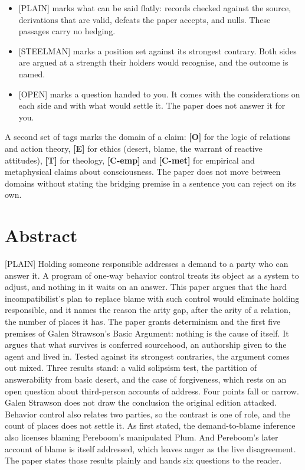 \documentclass[11pt]{article}
\newcommand{\register}[1]{{\ttfamily\small #1}}
\begin{document}
\begin{itemize}
\item \register{[PLAIN]} marks what can be said flatly: records checked against the source, derivations that are valid, defeats the paper accepts, and nulls. These passages carry no hedging.
\item \register{[STEELMAN]} marks a position set against its strongest contrary. Both sides are argued at a strength their holders would recognise, and the outcome is named.
\item \register{[OPEN]} marks a question handed to you. It comes with the considerations on each side and with what would settle it. The paper does not answer it for you.
\end{itemize}
A second set of tags marks the domain of a claim: \textbf{[O]} for the logic of relations and action theory, \textbf{[E]} for ethics (desert, blame, the warrant of reactive attitudes), \textbf{[T]} for theology, \textbf{[C-emp]} and \textbf{[C-met]} for empirical and metaphysical claims about consciousness. The paper does not move between domains without stating the bridging premise in a sentence you can reject on its own.

\section*{Abstract}

\register{[PLAIN]} Holding someone responsible addresses a demand to a party who can answer it. A program of one-way behavior control treats its object as a system to adjust, and nothing in it waits on an answer. This paper argues that the hard incompatibilist's plan to replace blame with such control would eliminate holding responsible, and it names the reason the arity gap, after the arity of a relation, the number of places it has. The paper grants determinism and the first five premises of Galen Strawson's Basic Argument: nothing is the cause of itself. It argues that what survives is conferred sourcehood, an authorship given to the agent and lived in. Tested against its strongest contraries, the argument comes out mixed. Three results stand: a valid solipsism test, the partition of answerability from basic desert, and the case of forgiveness, which rests on an open question about third-person accounts of address. Four points fall or narrow. Galen Strawson does not draw the conclusion the original edition attacked. Behavior control also relates two parties, so the contrast is one of role, and the count of places does not settle it. As first stated, the demand-to-blame inference also licenses blaming Pereboom's manipulated Plum. And Pereboom's later account of blame is itself addressed, which leaves anger as the live disagreement. The paper states those results plainly and hands six questions to the reader.
\end{document}
